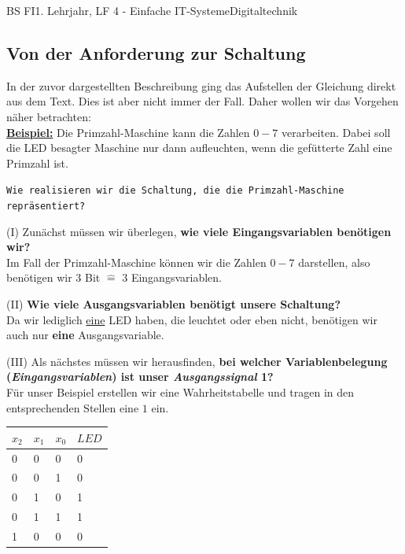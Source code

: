 \documentclass[11pt,twocolumn,oneside,openany,headings=optiontotoc,11pt,numbers=noenddot]{article}
\begin{document}
\begin{worksheet}{BS FI}{1. Lehrjahr, LF 4 - Einfache IT-Systeme}{Digitaltechnik}
		\subsection*{Von der Anforderung zur Schaltung}
		In der zuvor dargestellten Beschreibung ging das Aufstellen der Gleichung direkt aus dem Text. Dies ist aber nicht immer der Fall. Daher wollen wir das Vorgehen näher betrachten:\\
		\underline{\textbf{Beispiel:}} Die Primzahl-Maschine kann die Zahlen \(0 - 7\) verarbeiten. Dabei soll die LED besagter Maschine nur dann aufleuchten, wenn die \grq{}gefütterte\grq{} Zahl eine Primzahl ist.\\
		\par\noindent
		\texttt{Wie realisieren wir die Schaltung, die die Primzahl-Maschine repräsentiert?}\\
		\par
		(I) Zunächst müssen wir überlegen, \textbf{wie viele Eingangsvariablen benötigen wir?}\\
		Im Fall der Primzahl-Maschine können wir die Zahlen \(0 - 7\) darstellen, also benötigen wir \(3\) Bit \(\hat{=}\) \(3\) Eingangsvariablen.\\
		\par
		(II) \textbf{Wie viele Ausgangsvariablen benötigt unsere Schaltung?}\\
		Da wir lediglich \underline{eine} LED haben, die leuchtet oder eben nicht, benötigen wir auch nur \textbf{eine} Ausgangsvariable.\\
		\par
		(III) Als nächstes müssen wir herausfinden, \textbf{bei welcher Variablenbelegung (\textit{Eingangsvariablen}) ist unser \textit{Ausgangssignal} 1?}\\
		Für unser Beispiel erstellen wir eine Wahrheitstabelle und tragen in den entsprechenden Stellen eine \(1\) ein.\\
		\par\noindent
		\begin{tabularx}{0.48\textwidth}{|M|M|M|M|}
			\hline
			 \(x_2\) & \(x_1\) & \(x_0\) & \(LED\) \\
			 & 0 & 0 & 0\\
			 & 0 & 1 & 0\\
			\hline
			 0 & 1 & 0 & 1\\
			\hline
			 0 & 1 & 1 & 1\\
			 & 0 & 0 & 0\\

\end{tabularx}
\end{worksheet}
\end{document}
